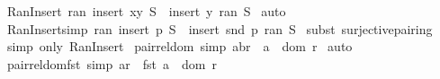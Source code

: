 \begin{isabellebody}
\isamarkupfalse%
%
\endisatagproof
{\isafoldproof}%
%
\isadelimproof
\isanewline
%
\endisadelimproof
\isanewline
\isanewline
{}\isamarkupfalse%
\ Ran{\isacharunderscore}Insert{}{\isacharcolon}\ {\isachardoublequoteopen}{\isacharparenleft}ran\ {\isacharparenleft}insert\ {\isacharparenleft}x{\isacharcomma}y{\isacharparenright}\ S{\isacharparenright}{\isacharparenright}\ {\isacharequal}\ insert\ y\ {\isacharparenleft}ran\ S{\isacharparenright}{\isachardoublequoteclose}\isanewline
%
\isadelimproof
%
\endisadelimproof
%
\isatagproof
{}\isamarkupfalse%
\ auto\isanewline
{}\isamarkupfalse%
%
\endisatagproof
{\isafoldproof}%
%
\isadelimproof
\isanewline
%
\endisadelimproof
\isanewline
{}\isamarkupfalse%
\ Ran{\isacharunderscore}Insert{\isacharbrackleft}simp{\isacharbrackright}{\isacharcolon}\ {\isachardoublequoteopen}{\isacharparenleft}ran\ {\isacharparenleft}insert\ p\ S{\isacharparenright}{\isacharparenright}\ {\isacharequal}\ insert\ {\isacharparenleft}snd\ p{\isacharparenright}\ {\isacharparenleft}ran\ S{\isacharparenright}{\isachardoublequoteclose}\isanewline
%
\isadelimproof
%
\endisadelimproof
%
\isatagproof
{}\isamarkupfalse%
\ {\isacharparenleft}subst\ surjective{\isacharunderscore}pairing{\isacharparenright}\isanewline
{}\isamarkupfalse%
\ {\isacharparenleft}simp\ only{\isacharcolon}\ Ran{\isacharunderscore}Insert{}{\isacharparenright}\isanewline
{}\isamarkupfalse%
%
\endisatagproof
{\isafoldproof}%
%
\isadelimproof
\isanewline
%
\endisadelimproof
\isanewline
\isanewline
\isanewline
\isanewline
{}\isamarkupfalse%
\ pair{\isacharunderscore}rel{\isacharunderscore}dom\ {\isacharbrackleft}simp{\isacharbrackright}{\isacharcolon}\ {\isachardoublequoteopen}{\isacharparenleft}a{\isacharcomma}b{\isacharparenright}{\isacharcolon}r\ {\isacharequal}{\isacharequal}{\isachargreater}\ {\isacharparenleft}a\ {\isacharcolon}\ {\isacharparenleft}dom\ r{\isacharparenright}{\isacharparenright}{\isachardoublequoteclose}\isanewline
%
\isadelimproof
%
\endisadelimproof
%
\isatagproof
{}\isamarkupfalse%
\ auto\isanewline
{}\isamarkupfalse%
%
\endisatagproof
{\isafoldproof}%
%
\isadelimproof
\isanewline
%
\endisadelimproof
\ \ \isanewline
{}\isamarkupfalse%
\ pair{\isacharunderscore}rel{\isacharunderscore}dom{\isacharunderscore}fst\ {\isacharbrackleft}simp{\isacharbrackright}{\isacharcolon}\ {\isachardoublequoteopen}a{\isacharcolon}r\ {\isacharequal}{\isacharequal}{\isachargreater}\ {\isacharparenleft}{\isacharparenleft}fst\ a{\isacharparenright}\ {\isacharcolon}\ {\isacharparenleft}dom\ r{\isacharparenright}{\isacharparenright}{\isachardoublequoteclose}\isanewline

\end{isabellebody}
